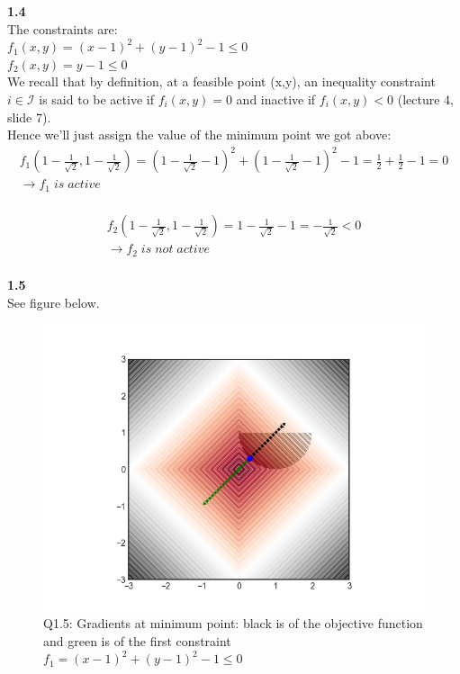 \documentclass[fleqn]{article}
\begin{document}
\textbf{1.4} \\
The constraints are: \\
$f_1 (x,y) = (x-1)^2+(y-1)^2-1 \leq 0$ \\
$f_2 (x,y) = y-1 \leq 0$ \\

We recall that by definition, at a feasible point (x,y), an inequality constraint $ i \in \mathcal{I}$ is said to be active if $f_i (x,y) = 0$ and inactive if $f_i (x,y) < 0$ (lecture 4, slide 7).\\
Hence we'll just assign the value of the minimum point we got above: \\
\begin{multline*}
f_1(1-\frac{1}{\sqrt{2}}, 1-\frac{1}{\sqrt{2}}) = 
(1-\frac{1}{\sqrt{2}}-1)^2 + (1-\frac{1}{\sqrt{2}}-1)^2 -1 = 
\frac{1}{2}+\frac{1}{2}-1 = 0 \\
\rightarrow \boxed{f_1 \; is \; active}
\end{multline*} \\

\begin{multline*}
f_2(1-\frac{1}{\sqrt{2}}, 1-\frac{1}{\sqrt{2}}) = 
1-\frac{1}{\sqrt{2}}-1 = -\frac{1}{\sqrt{2}} < 0 \\
\rightarrow \boxed{f_2 \; is \; not\; active}
\end{multline*} \\

\textbf{1.5} \\
See figure below. \\

\begin{figure}[h!]
\includegraphics[width=0.8\linewidth]{q1_5.PNG}
\caption{Q1.5: Gradients at minimum point: black is of the objective function and green is of the first constraint $f_1 = (x-1)^2+(y-1)^2-1 \leq 0$}
\end{figure}
\end{document}
